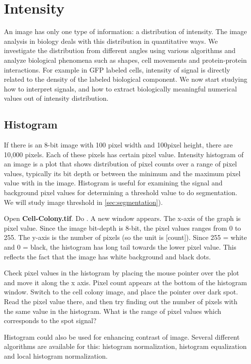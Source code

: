 
\section{Intensity}

An image has only one type of information: a distribution of intensity. The image analysis in biology deals with this distribution in quantitative ways. We investigate the distribution from different angles using various algorithms and analyze biological phenomena such as shapes, cell movements and protein-protein interactions. For example in GFP labeled cells, intensity of signal is directly related to the density of the labeled biological component.
We now start studying how to interpret signals, and how to extract biologically meaningful numerical values out of intensity distribution. 

\subsection{Histogram}
\label{subsec:histogram}

If there is an 8-bit image with 100 pixel width and 100pixel height,
there are 10,000 pixels. Each of these pixels has certain pixel value.
Intensity histogram of an image is a plot that shows distribution of pixel counts over a range of pixel values, 
typically its bit depth or between the minimum and the maximum pixel value with in the image. 
Histogram is useful for examining the signal and
background pixel values for determining a threshold value to do segmentation.
We will study image threshold in \ref{sec:segmentation}). 


\begin{indentexercise}{1}
Open \textbf{Cell-Colony.tif}. Do
. A new window appears. The
x-axis of the graph is pixel value. Since the image bit-depth is 8-bit,
the pixel values ranges from 0 to 255. The y-axis is the number of
pixels (so the unit is [count]). Since 255 = white and 0 = black, the
histogram has long tail towards the lower pixel value. This reflects
the fact that the image has white background and black dots.

Check pixel values in the histogram by placing the mouse pointer over
the plot and move it along the x axis. Pixel count appears at the
bottom of the histogram window. Switch to the cell colony image, and
place the pointer over dark spot. Read the pixel value there, and then
try finding out the number of pixels with the same value in the
histogram. What is the range of pixel values which corresponds to the
spot signal?  
\end{indentexercise} 
Histogram could also be used for enhancing contrast of image. Several
different algorithms are available for this: histogram normalization,
histogram equalization and local histogram normalization. 

